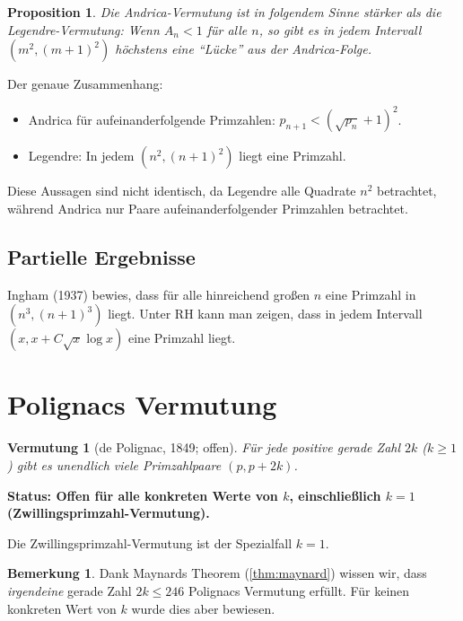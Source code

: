 \documentclass[12pt,a4paper]{amsart}
\newtheorem{proposition}[theorem]{Proposition}
\newtheorem{vermutung}[theorem]{Vermutung}
\theoremstyle{definition}
\newtheorem{bemerkung}[theorem]{Bemerkung}
\begin{document}
\begin{proposition}
Die Andrica-Vermutung ist in folgendem Sinne st\"{a}rker als die
Legendre-Vermutung: Wenn $A_n < 1$ f\"{u}r alle $n$, so gibt es in jedem
Intervall $(m^2, (m+1)^2)$ h\"{o}chstens eine "`L\"{u}cke"' aus der Andrica-Folge.
\end{proposition}

Der genaue Zusammenhang:
\begin{itemize}
  \item Andrica f\"{u}r aufeinanderfolgende Primzahlen: $p_{n+1} < (\sqrt{p_n}+1)^2$.
  \item Legendre: In jedem $(n^2, (n+1)^2)$ liegt eine Primzahl.
\end{itemize}

Diese Aussagen sind nicht identisch, da Legendre alle Quadrate $n^2$ betrachtet,
w\"{a}hrend Andrica nur Paare aufeinanderfolgender Primzahlen betrachtet.

\subsection{Partielle Ergebnisse}

Ingham (1937) bewies, dass f\"{u}r alle hinreichend gro\ss{}en $n$ eine Primzahl in
$(n^3, (n+1)^3)$ liegt. Unter RH kann man zeigen, dass in jedem Intervall
$(x, x + C\sqrt{x}\log x)$ eine Primzahl liegt.

\section{Polignacs Vermutung}

\begin{vermutung}[de Polignac, 1849; offen]
\label{verm:polignac}
F\"{u}r jede positive gerade Zahl $2k$ ($k \geq 1$) gibt es unendlich viele
Primzahlpaare $(p, p + 2k)$.
\end{vermutung}

\textbf{Status: Offen f\"{u}r alle konkreten Werte von $k$, einschlie\ss{}lich $k=1$
(Zwillingsprimzahl-Vermutung).}

Die Zwillingsprimzahl-Vermutung ist der Spezialfall $k=1$.

\begin{bemerkung}
Dank Maynards Theorem (\ref{thm:maynard}) wissen wir, dass \emph{irgendeine}
gerade Zahl $2k \leq 246$ Polignacs Vermutung erf\"{u}llt. F\"{u}r keinen konkreten
Wert von $k$ wurde dies aber bewiesen.
\end{bemerkung}
\end{document}

